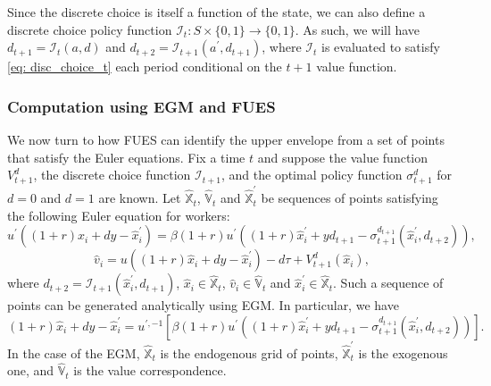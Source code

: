 \documentclass[12pt]{article}
\begin{document}
Since the discrete choice is itself a function of the state, we can also define a discrete choice policy function $\mathcal{I}_{t}\colon S\times \{0,1\}\rightarrow \{0,1\}$. As such, we will have $d_{t+1} = \mathcal{I}_{t}(a,d)$ and $d_{t+2} = \mathcal{I}_{t+1}(a^{\prime},d_{t+1})$, where $\mathcal{I}_{t}$ is evaluated to satisfy \eqref{eq: disc_choice_t} each period conditional on the $t+1$ value function.  


\subsubsection{Computation using EGM and FUES}\label{sec: FUES_RET}

We now turn to how FUES can identify the upper envelope from a set of points that satisfy the Euler equations. Fix a time $t$ and suppose the value function $V_{t+1}^{d}$, the discrete choice function $\mathcal{I}_{t+1}$, and the optimal policy function $\sigma_{t+1}^{d}$ for $d=0$ and $d=1$ are known. Let $\hat{\mathbb{X}}_{t}$, $\hat{\mathbb{V}}_{t}$ and $\hat{\mathbb{X}}_{t}^{\prime}$ be sequences of points satisfying the following Euler equation for workers:
%
\begin{equation}\label{eq: Euler_func_ret}
    u^{\prime}((1+r)\hat{x}_{i} + dy - \hat{x}^{\prime}_{i}) = \beta (1+r) u^{\prime}((1+r)\hat{x}^{\prime}_{i} + y d_{t+1} - \sigma_{t+1}^{d_{t+1}}(\hat{x}^{\prime}_{i},d_{t+2})),
\end{equation}
\vspace{-1em}
\begin{equation}
    \hat{v}_{i} = u((1+r)\hat{x}_{i} + dy - \hat{x}^{\prime}_{i}) - d\tau + V_{t+1}^{d}(\hat{x}_{i}),
\end{equation}
%
where $d_{t+2} = \mathcal{I}_{t+1}(\hat{x}^{\prime}_{i},d_{t+1})$, $\hat{x}_{i}\in \hat{\mathbb{X}}_{t}$, $\hat{v}_{i}\in \hat{\mathbb{V}}_{t}$ and $\hat{x}_{i}^{\prime}\in \hat{\mathbb{X}}_{t}$. Such a sequence of points can be generated analytically using EGM. In particular, we have
%
\begin{equation}
 (1+r)\hat{x}_{i} + dy - \hat{x}^{\prime}_{i}  =  u^{\prime,-1}\left[\beta (1+r) u^{\prime}((1+r)\hat{x}^{\prime}_{i} + yd_{t+1} - \sigma_{t+1}^{d_{t+1}}(\hat{x}^{\prime}_{i},d_{t+2}))\right].
\end{equation}
%
%
In the case of the EGM, $\hat{\mathbb{X}}_{t}$ is the endogenous grid of points, $\hat{\mathbb{X}}_{t}^{\prime}$ is the exogenous one, and $\hat{\mathbb{V}}_{t}$ is the value correspondence.  
\end{document}
